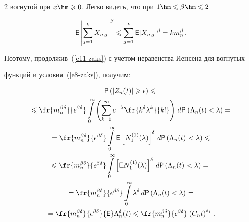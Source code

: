 \begin{multicols}{2}
вогнутой при $x\hm\geqslant0$. Легко видеть, что при $1\hm\leqslant\beta\hm\leqslant2$

$$

{\sf E}\left|\sum\limits_{j=1}^kX_{n,j}\right|^{\beta}\leqslant\sum\limits_{j=1}^k{\sf E}|X_{n,j}|^{\beta}=km_n^{\beta}\,.

$$

Поэтому, продолжив~(\ref{e11-zaks}) с учетом неравенства Иенсена для вогнутых

функций и условия~(\ref{e8-zaks}), получим:



\noindent

\begin{multline*}

{\sf P}\left(|Z_n(t)|\geqslant\epsilon\right)\leqslant{}\\

{}\leqslant

\fr{m_n^{\beta\delta}}{\epsilon^{\beta\delta}}\int\limits_{0}^{\infty}

\left(\sum\limits_{k=0}^{\infty}e^{-\lambda}\fr{k^{\delta}\lambda^k}{k!}\right)\,d{\sf P}\left(\Lambda_n(t)<\lambda\right)={}\\

{}=

\fr{m_n^{\beta\delta}}{\epsilon^{\beta\delta}}\int\limits_{0}^{\infty}{\sf E}\left[N^{(1)}_1(\lambda)\right]^{\delta}\,d{\sf P}

\left(\Lambda_n(t)<\lambda\right)\leqslant{}

\\

\leqslant\fr{m_n^{\beta\delta}}{\epsilon^{\beta\delta}}\int\limits_{0}^{\infty}\left[{\sf E}N^{(1)}_1(\lambda)\right]^{\delta}\,d{\sf P}

\left(\Lambda_n(t)<\lambda\right)={}\\

{}=\fr{m_n^{\beta\delta}}{\epsilon^{\beta\delta}}\int\limits_{0}^{\infty}\lambda^{\delta}\,d{\sf P}

\left(\Lambda_n(t)<\lambda\right)={}\\

{}=

\fr{m_n^{\beta\delta}}{\epsilon^{\beta\delta}}{\sf E}\Lambda_n^{\delta}(t)\leqslant

\fr{m_n^{\beta\delta}}{\epsilon^{\beta\delta}}\left(C_nt\right)^{\delta_1}\,.

\end{multline*}


\end{multicols}
